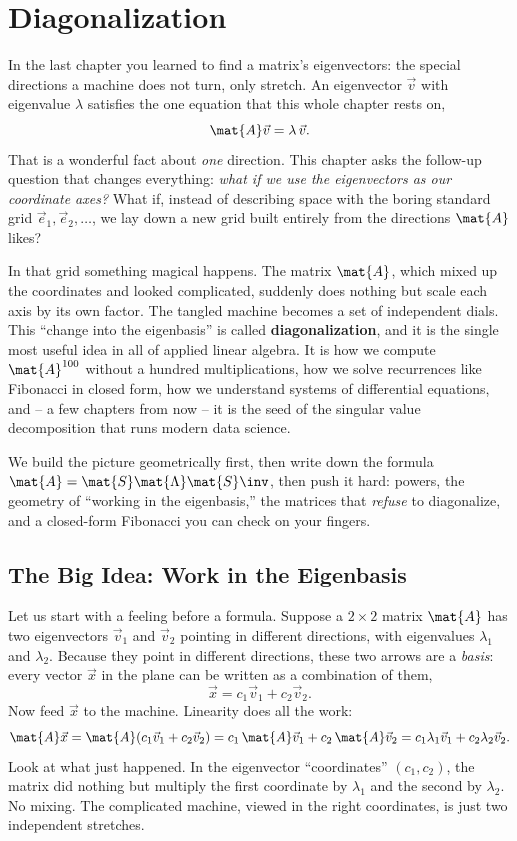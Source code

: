 \chapter{Diagonalization}

In the last chapter you learned to find a matrix's eigenvectors: the special
directions a machine does not turn, only stretch. An eigenvector $\vec{v}$ with
eigenvalue $\lambda$ satisfies the one equation that this whole chapter rests on,
\[
  \mat{A}\vec{v} = \lambda\,\vec{v}.
\]
That is a wonderful fact about \emph{one} direction. This chapter asks the
follow-up question that changes everything: \emph{what if we use the
eigenvectors as our coordinate axes?} What if, instead of describing space with
the boring standard grid $\vec{e}_1, \vec{e}_2, \dots$, we lay down a new grid
built entirely from the directions $\mat{A}$ likes?

In that grid something magical happens. The matrix $\mat{A}$, which mixed up the
coordinates and looked complicated, suddenly does nothing but scale each axis by
its own factor. The tangled machine becomes a set of independent dials. This
``change into the eigenbasis'' is called \textbf{diagonalization}, and it is the
single most useful idea in all of applied linear algebra. It is how we compute
$\mat{A}^{100}$ without a hundred multiplications, how we solve recurrences like
Fibonacci in closed form, how we understand systems of differential equations,
and -- a few chapters from now -- it is the seed of the singular value
decomposition that runs modern data science.

We build the picture geometrically first, then write down the formula
$\mat{A} = \mat{S}\mat{\Lambda}\mat{S}\inv$, then push it hard: powers, the
geometry of ``working in the eigenbasis,'' the matrices that \emph{refuse} to
diagonalize, and a closed-form Fibonacci you can check on your fingers.

\section{The Big Idea: Work in the Eigenbasis}
\label{ch24:big-idea}

Let us start with a feeling before a formula. Suppose a $2\times 2$ matrix
$\mat{A}$ has two eigenvectors $\vec{v}_1$ and $\vec{v}_2$ pointing in different
directions, with eigenvalues $\lambda_1$ and $\lambda_2$. Because they point in
different directions, these two arrows are a \emph{basis}: every vector $\vec{x}$
in the plane can be written as a combination of them,
\[
  \vec{x} = c_1\vec{v}_1 + c_2\vec{v}_2.
\]
Now feed $\vec{x}$ to the machine. Linearity does all the work:
\[
  \mat{A}\vec{x}
  = \mat{A}(c_1\vec{v}_1 + c_2\vec{v}_2)
  = c_1\,\mat{A}\vec{v}_1 + c_2\,\mat{A}\vec{v}_2
  = c_1\lambda_1\vec{v}_1 + c_2\lambda_2\vec{v}_2.
\]
Look at what just happened. In the eigenvector ``coordinates'' $(c_1, c_2)$, the
matrix did nothing but multiply the first coordinate by $\lambda_1$ and the
second by $\lambda_2$. No mixing. The complicated machine, viewed in the right
coordinates, is just two independent stretches.

